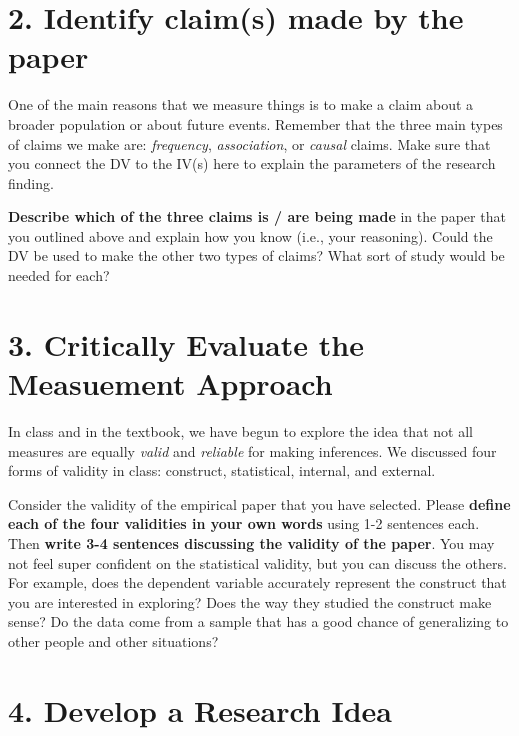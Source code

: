 \documentclass[
]{book}
\begin{document}
\section*{2. Identify claim(s) made by the paper}\label{identify-claims-made-by-the-paper}

One of the main reasons that we measure things is to make a claim about a broader population or about future events. Remember that the three main types of claims we make are: \emph{frequency}, \emph{association}, or \emph{causal} claims. Make sure that you connect the DV to the IV(s) here to explain the parameters of the research finding.

\textbf{Describe which of the three claims is / are being made} in the paper that you outlined above and explain how you know (i.e., your reasoning). Could the DV be used to make the other two types of claims? What sort of study would be needed for each?

\section*{3. Critically Evaluate the Measuement Approach}\label{critically-evaluate-the-measuement-approach}

In class and in the textbook, we have begun to explore the idea that not all measures are equally \emph{valid} and \emph{reliable} for making inferences. We discussed four forms of validity in class: construct, statistical, internal, and external.

Consider the validity of the empirical paper that you have selected. Please \textbf{define each of the four validities in your own words} using 1-2 sentences each. Then \textbf{write 3-4 sentences discussing the validity of the paper}. You may not feel super confident on the statistical validity, but you can discuss the others. For example, does the dependent variable accurately represent the construct that you are interested in exploring? Does the way they studied the construct make sense? Do the data come from a sample that has a good chance of generalizing to other people and other situations?

\section*{4. Develop a Research Idea}\label{develop-a-research-idea}
\end{document}
